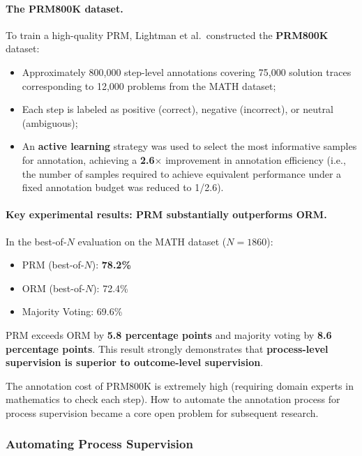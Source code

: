 \paragraph{The PRM800K dataset.}
To train a high-quality PRM, Lightman et al.\ constructed the \textbf{PRM800K} dataset:
\begin{itemize}[leftmargin=2em]
  \item Approximately 800,000 step-level annotations covering 75,000 solution traces corresponding to 12,000 problems from the MATH dataset;
  \item Each step is labeled as positive (correct), negative (incorrect), or neutral (ambiguous);
  \item An \textbf{active learning} strategy was used to select the most informative samples for annotation,
    achieving a \textbf{2.6$\times$} improvement in annotation efficiency
    (i.e., the number of samples required to achieve equivalent performance under a fixed annotation budget was reduced to 1/2.6).
\end{itemize}

\paragraph{Key experimental results: PRM substantially outperforms ORM.}
In the best-of-$N$ evaluation on the MATH dataset ($N = 1860$):
\begin{itemize}[leftmargin=2em]
  \item PRM (best-of-$N$): \textbf{78.2\%}
  \item ORM (best-of-$N$): 72.4\%
  \item Majority Voting: 69.6\%
\end{itemize}

\noindent
PRM exceeds ORM by \textbf{5.8 percentage points} and majority voting by \textbf{8.6 percentage points}.
This result strongly demonstrates that \textbf{process-level supervision is superior to outcome-level supervision}.

\begin{openproblembox}
The annotation cost of PRM800K is extremely high (requiring domain experts in mathematics to check each step).
How to automate the annotation process for process supervision became a core open problem for subsequent research.
\end{openproblembox}

\subsubsection{Automating Process Supervision}

